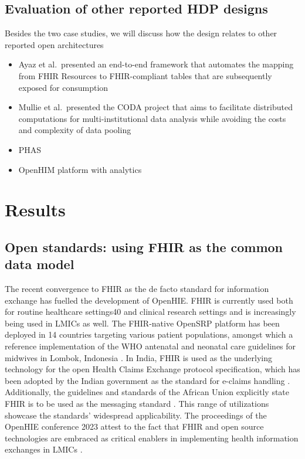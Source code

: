 \documentclass[
  authoryear]{elsarticle}
\providecommand{\tightlist}{%
  \setlength{\itemsep}{0pt}\setlength{\parskip}{0pt}}\usepackage{longtable,booktabs,array}
\begin{document}
\subsection{Evaluation of other reported HDP
designs}\label{evaluation-of-other-reported-hdp-designs}

Besides the two case studies, we will discuss how the design relates to
other reported open architectures

\begin{itemize}
\tightlist
\item
  Ayaz et al.~presented an end-to-end framework that automates the
  mapping from FHIR Resources to FHIR-compliant tables that are
  subsequently exposed for consumption \citep{ayaz2023transforming}
\item
  Mullie et al.~presented the CODA project that aims to facilitate
  distributed computations for multi-institutional data analysis while
  avoiding the costs and complexity of data pooling
  \citep{mullie2023coda}
\item
  PHAS \citep{abbasian2023phas}
\item
  OpenHIM platform with analytics
\end{itemize}

\section{Results}\label{results}

\subsection{Open standards: using FHIR as the common data
model}\label{open-standards-using-fhir-as-the-common-data-model}

The recent convergence to FHIR as the de facto standard for information
exchange has fuelled the development of OpenHIE. FHIR is currently used
both for routine healthcare settings40 and clinical research settings
\citep{duda2022hl7, vorisek2022fast} and is increasingly being used in
LMICs as well. The FHIR-native OpenSRP platform \citep{mehl2020open} has
been deployed in 14 countries targeting various patient populations,
amongst which a reference implementation of the WHO antenatal and
neonatal care guidelines for midwives in Lombok, Indonesia
\citep{summitinstitutefordevelopment2023bunda, kurniawan2019midwife}. In
India, FHIR is used as the underlying technology for the open Health
Claims Exchange protocol specification, which has been adopted by the
Indian government as the standard for e-claims handling \citep{hcx}.
Additionally, the guidelines and standards of the African Union
explicitly state FHIR is to be used as the messaging standard
\citep{2023african}. This range of utilizations showcase the standards'
widespread applicability. The proceedings of the OpenHIE conference 2023
attest to the fact that FHIR and open source technologies are embraced
as critical enablers in implementing health information exchanges in
LMICs \citep{ohie23}.
\end{document}
